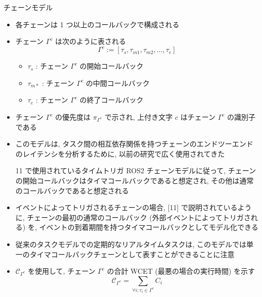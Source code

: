 \begin{frame}{チェーンモデル}
    \begin{itemize}
        \item 各チェーンは 1 つ以上のコールバックで構成される
\item チェーン $\Gamma^{c}$ は次のように表される
              \begin{equation*}
                  \Gamma^{c}:=\left[\tau_{s}, \tau_{m 1}, \tau_{m 2}, \ldots, \tau_{e}\right]
              \end{equation*}
              \begin{itemize}
                  \item  $\tau_{s}$ : チェーン $\Gamma^{c}$ の開始コールバック

                  \item  $\tau_{m *}$ : チェーン $\Gamma^{c}$ の中間コールバック

                  \item  $\tau_{e}$ : チェーン $\Gamma^{c}$ の終了コールバック

              \end{itemize}
    \end{itemize}
\end{frame}

\begin{frame}{}
    \begin{itemize}
        \item チェーン $\Gamma^{c}$ の優先度は $\pi_{\Gamma^{c}}$ で示され, 上付き文字 $c$ はチェーン $\Gamma^{c}$ の識別子である
\item このモデルは, タスク間の相互依存関係を持つチェーンのエンドツーエンドのレイテンシを分析するために, 以前の研究で広く使用されてきた
\item [11] で使用されているタイムトリガ ROS2 チェーンモデルに従って, チェーンの開始コールバックはタイマコールバックであると想定され, その他は通常のコールバックであると想定される
\item イベントによってトリガされるチェーンの場合, [11] で説明されているように, チェーンの最初の通常のコールバック (外部イベントによってトリガされる) を, イベントの到着期間を持つタイマコールバックとしてモデル化できる
\item 従来のタスクモデルでの定期的なリアルタイムタスクは, このモデルでは単一のタイマコールバックチェーンとして表すことができることに注意
    \end{itemize}
\end{frame}

\begin{frame}{}
    \begin{itemize}
        \item $\mathcal{C}_{\Gamma^{c}}$ を使用して, チェーン $\Gamma^{c}$ の合計 WCET (最悪の場合の実行時間) を示す
              \begin{equation*}
                  \mathcal{C}_{\Gamma^{c}}=\sum_{\forall i: \tau_{i} \in \Gamma^{c}} C_{i}
              \end{equation*}
    \end{itemize}
\end{frame}

